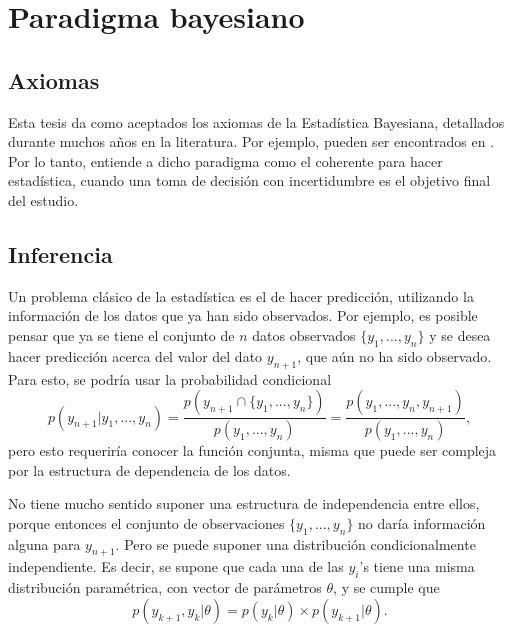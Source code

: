 \chapter[Paradigma bayesiano]{Paradigma bayesiano\raisebox{.3\baselineskip}{\normalsize\footnotemark}}



\section{Axiomas}
Esta tesis da como aceptados los axiomas de la Estad\'istica Bayesiana, detallados durante muchos años en la literatura. Por ejemplo, pueden ser encontrados en \cite{Fishburn_Axioms}. Por lo tanto, entiende a dicho paradigma como el coherente para hacer estad\'istica, cuando una toma de decisi\'on con incertidumbre es el objetivo final del estudio. 

\section{Inferencia}

Un problema clásico de la estad\'istica es el de hacer predicci\'on, utilizando la informaci\'on de los datos que ya han sido observados. Por ejemplo, es posible pensar que ya se tiene el conjunto de $n$ datos observados $\{y_1, ..., y_n\}$ y se desea hacer predicci\'on acerca del valor del dato $y_{n+1}$, que a\'un no ha sido observado. Para esto, se podr\'ia usar la probabilidad condicional
\begin{equation*}
    p(y_{n+1}|y_1,...,y_n) =
    \frac{p(y_{n+1} \cap \{y_1, ..., y_n\})}{p(y_1, ..., y_n)} =
    \frac{p(y_1, ..., y_n,y_{n+1})}{p(y_1, ..., y_n)},
\end{equation*}
pero esto requerir\'ia conocer la funci\'on conjunta, misma que puede ser compleja por la estructura de dependencia de los datos.

No tiene mucho sentido suponer una estructura de independencia entre ellos, porque entonces el conjunto de observaciones $\{y_1, ..., y_n\}$ no dar\'ia informaci\'on alguna para $y_{n+1}$. Pero se puede suponer una distribuci\'on condicionalmente independiente. Es decir, se supone que cada una de las $y_i$'s tiene una misma distribuci\'on param\'etrica, con vector de par\'ametros $\theta$, y se cumple que
\begin{equation*}
    p(y_{k+1},y_k | \theta) =  p(y_k | \theta) \times p(y_{k+1} | \theta).
\end{equation*}

